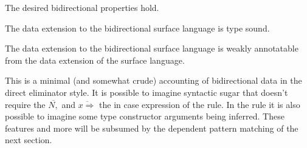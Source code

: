 The desired bidirectional properties hold.
\begin{claim}
The data extension to the bidirectional surface language is type sound.
\end{claim}

\begin{claim}
The data extension to the bidirectional surface language is weakly annotatable from the data extension of the surface language.
\end{claim}

This is a minimal (and somewhat crude) accounting of bidirectional data in the direct eliminator style.
It is possible to imagine syntactic sugar that doesn't require the $\overline{N,}$ and $\overline{x\Rightarrow}$ the in case expression of the  rule.
In the rule  it is also possible to imagine some type constructor arguments being inferred.
These features and more will be subsumed by the dependent pattern matching of the next section. %
